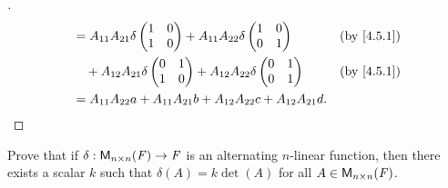 \begin{proof}[]
\begin{align*}
                          & = A_{1 1} A_{2 1} \delta\begin{pmatrix}
                                                      1 & 0 \\
                                                      1 & 0
                                                    \end{pmatrix} + A_{1 1} A_{2 2} \delta\begin{pmatrix}
                                                                                            1 & 0 \\
                                                                                            0 & 1
                                                                                          \end{pmatrix}                            &  & \by{4.5.1}       \\
                          & \quad + A_{1 2} A_{2 1} \delta\begin{pmatrix}
                                                            0 & 1 \\
                                                            1 & 0
                                                          \end{pmatrix} + A_{1 2} A_{2 2} \delta\begin{pmatrix}
                                                                                                  0 & 1 \\
                                                                                                  0 & 1
                                                                                                \end{pmatrix}                            &  & \by{4.5.1} \\
                          & = A_{1 1} A_{2 2} a + A_{1 1} A_{2 1} b + A_{1 2} A_{2 2} c + A_{1 2} A_{2 1} d.
  \end{align*}
\end{proof}

\begin{ex}\label{ex:4.5.16}
  Prove that if \(\delta : \ms[n][n][\F] \to \F\) is an alternating \(n\)-linear function, then there exists a scalar \(k\) such that \(\delta(A) = k \det(A)\) for all \(A \in \ms[n][n][\F]\).
\end{ex}

